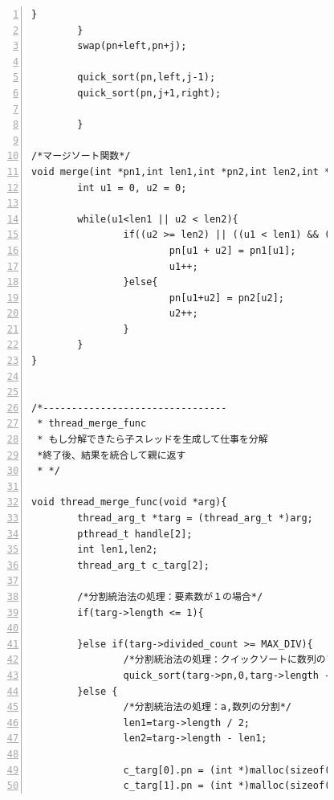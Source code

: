 \documentclass[11pt,a4paper]{jsarticle}
\begin{document}
\begin{figure}[htbp]
 \begin{center}
  \begin{Verbatim}[frame=single,baselinestretch=1,fontsize=\footnotesize,numbers=left]
				}
		}
		swap(pn+left,pn+j);

		quick_sort(pn,left,j-1);
		quick_sort(pn,j+1,right);

		}

/*マージソート関数*/
void merge(int *pn1,int len1,int *pn2,int len2,int *pn){
		int u1 = 0, u2 = 0;

		while(u1<len1 || u2 < len2){
				if((u2 >= len2) || ((u1 < len1) && (pn1[u1] < pn2[u2]))){
						pn[u1 + u2] = pn1[u1];
						u1++;
				}else{
						pn[u1+u2] = pn2[u2];
						u2++;
				}
		}
}


/*--------------------------------
 * thread_merge_func
 * もし分解できたら子スレッドを生成して仕事を分解
 *終了後、結果を統合して親に返す
 * */

void thread_merge_func(void *arg){
		thread_arg_t *targ = (thread_arg_t *)arg;
		pthread_t handle[2];
		int len1,len2;
		thread_arg_t c_targ[2];

        /*分割統治法の処理：要素数が１の場合*/
		if(targ->length <= 1){

		}else if(targ->divided_count >= MAX_DIV){
				/*分割統治法の処理：クイックソートに数列のソート*/
				quick_sort(targ->pn,0,targ->length - 1);
		}else {
				/*分割統治法の処理：a,数列の分割*/
				len1=targ->length / 2;
				len2=targ->length - len1;

				c_targ[0].pn = (int *)malloc(sizeof(int) * len1);
				c_targ[1].pn = (int *)malloc(sizeof(int) * len2);
  \end{Verbatim}
 \end{center}
\end{figure}
\end{document}

